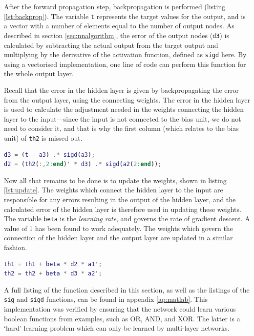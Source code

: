 After the forward propagation step, backpropagation is performed (listing \ref{lst:backprop}).  The variable {\tt t} represents the target values for the output, and is a vector with a number of elements equal to the number of output nodes.  As described in section \ref{sec:nnalgorithm}, the error of the output nodes ({\tt d3}) is calculated by subtracting the actual output from the target output and multiplying by the derivative of the activation function, defined as {\tt sigd} here.  By using a vectorised implementation, one line of code can perform this function for the whole output layer.

Recall that the error in the hidden layer is given by backpropagating the error from the output layer, using the connecting weights.  The error in the hidden layer is used to calculate the adjustment needed in the weights connecting the hidden layer to the input---since the input is not connected to the bias unit, we do not need to consider it, and that is why the first column (which relates to the bias unit) of {\tt th2} is missed out.

\begin{lstlisting}[language=Matlab,label=lst:backprop,caption={Backpropagation code},captionpos=b]
d3 = (t - a3) .* sigd(a3);
d2 = (th2(:,2:end)' * d3) .* sigd(a2(2:end));
\end{lstlisting}

Now all that remains to be done is to update the weights, shown in listing \ref{lst:update}.  The weights which connect the hidden layer to the input are responsible for any errors resulting in the output of the hidden layer, and the calculated error of the hidden layer is therefore used in updating these weights.  The variable {\tt beta} is the \emph{learning rate}, and governs the rate of gradient descent.  A value of 1 has been found to work adequately.  The weights which govern the connection of the hidden layer and the output layer are updated in a similar fashion.

\begin{lstlisting}[language=Matlab,label=lst:update,caption={Weight update code},captionpos=b]
th1 = th1 + beta * d2 * a1';
th2 = th2 + beta * d3 * a2';
\end{lstlisting}

A full listing of the function described in this section, as well as the listings of the {\tt sig} and {\tt sigd} functions, can be found in appendix \ref{ap:matlab}.  This implementation was verified by ensuring that the network could learn various boolean functions from examples, such as OR, AND, and XOR.  The latter is a `hard' learning problem which can only be learned by multi-layer networks.

